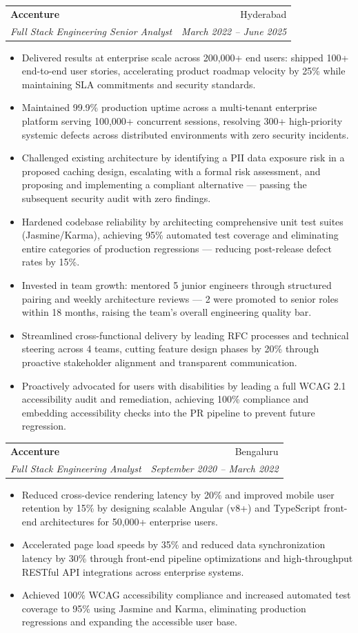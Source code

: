 \documentclass[letterpaper,11pt]{article}
\makeatletter
\newcommand{\resumeItem}[1]{\item\small{{#1 \vspace{-2pt}}}}
\newcommand{\resumeSubheading}[4]{
  \vspace{-2pt}\item
    \begin{tabular*}{0.97\textwidth}[t]{l@{\extracolsep{\fill}}r}
      \textbf{#1} & #2 \\
      \textit{\small#3} & \textit{\small #4} \\
    \end{tabular*}\vspace{-7pt}
}
\newcommand{\resumeItemListStart}{\begin{itemize}}
\newcommand{\resumeItemListEnd}{\end{itemize}\vspace{-5pt}}
\makeatother
\begin{document}
    \resumeSubheading
      {Accenture}{Hyderabad}
      {Full Stack Engineering Senior Analyst}{March 2022 -- June 2025}
      \resumeItemListStart
        \resumeItem{Delivered results at enterprise scale across 200,000+ end users: shipped 100+ end-to-end user stories, accelerating product roadmap velocity by 25\% while maintaining SLA commitments and security standards.}
        \resumeItem{Maintained 99.9\% production uptime across a multi-tenant enterprise platform serving 100,000+ concurrent sessions, resolving 300+ high-priority systemic defects across distributed environments with zero security incidents.}
        \resumeItem{Challenged existing architecture by identifying a PII data exposure risk in a proposed caching design, escalating with a formal risk assessment, and proposing and implementing a compliant alternative --- passing the subsequent security audit with zero findings.}
        \resumeItem{Hardened codebase reliability by architecting comprehensive unit test suites (Jasmine/Karma), achieving 95\% automated test coverage and eliminating entire categories of production regressions --- reducing post-release defect rates by 15\%.}
        \resumeItem{Invested in team growth: mentored 5 junior engineers through structured pairing and weekly architecture reviews --- 2 were promoted to senior roles within 18 months, raising the team's overall engineering quality bar.}
        \resumeItem{Streamlined cross-functional delivery by leading RFC processes and technical steering across 4 teams, cutting feature design phases by 20\% through proactive stakeholder alignment and transparent communication.}
        \resumeItem{Proactively advocated for users with disabilities by leading a full WCAG 2.1 accessibility audit and remediation, achieving 100\% compliance and embedding accessibility checks into the PR pipeline to prevent future regression.}
      \resumeItemListEnd

    \resumeSubheading
      {Accenture}{Bengaluru}
      {Full Stack Engineering Analyst}{September 2020 -- March 2022}
      \resumeItemListStart
        \resumeItem{Reduced cross-device rendering latency by 20\% and improved mobile user retention by 15\% by designing scalable Angular (v8+) and TypeScript front-end architectures for 50,000+ enterprise users.}
        \resumeItem{Accelerated page load speeds by 35\% and reduced data synchronization latency by 30\% through front-end pipeline optimizations and high-throughput RESTful API integrations across enterprise systems.}
        \resumeItem{Achieved 100\% WCAG accessibility compliance and increased automated test coverage to 95\% using Jasmine and Karma, eliminating production regressions and expanding the accessible user base.}
      \resumeItemListEnd
\end{document}
